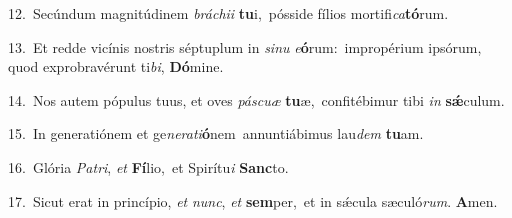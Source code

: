 {\numbfont\textcolor{\numbcolor}{12.}}~Secúndum magnitúdinem \textit{brá}\-\textit{chi}\textit{i} \textbf{tu}\-i,~\star pósside fílios mortifi\-\textit{ca}\-\textbf{tó}rum.\par
{\numbfont\textcolor{\numbcolor}{13.}}~Et redde vicínis nostris séptuplum in \textit{si}\-\textit{nu} \textit{e}\-\textbf{ó}rum:~\star impropérium ipsórum, quod exprobravérunt ti\-\textit{bi}\-, \textbf{Dó}\-mine.\par
{\numbfont\textcolor{\numbcolor}{14.}}~Nos autem pópulus tuus, et oves \textit{pás}\-\textit{cu}\textit{æ} \textbf{tu}\-æ,~\star confitébimur tibi \textit{in} \textbf{sǽ}\-culum.\par
{\numbfont\textcolor{\numbcolor}{15.}}~In generatiónem et ge\-\textit{ne}\-\textit{ra}\textit{ti}\textbf{ó}nem~\star annuntiábimus lau\textit{dem} \textbf{tu}\-am.\par
{\numbfont\textcolor{\numbcolor}{16.}}~Glória \textit{Pa}\-\textit{tri}, \textit{et} \textbf{Fí}\-lio,~\star et Spirítu\textit{i} \textbf{Sanc}\-to.\par
{\numbfont\textcolor{\numbcolor}{17.}}~Sicut erat in princípio, \textit{et} \textit{nunc}\-, \textit{et} \textbf{sem}\-per,~\star et in sǽcula sæculó\-\textit{rum}\-. \textbf{A}\-men.\par

